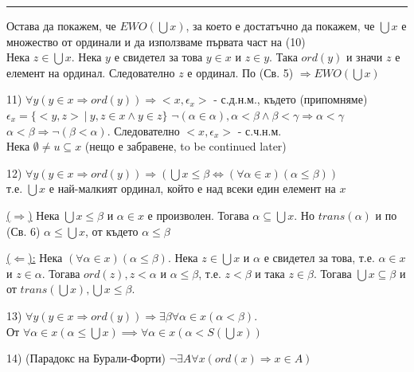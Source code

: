 \documentclass[fleqn, titlepage, 12pt]{report}
\begin{document}
\bigbreak
\hrule
\bigbreak

Остава да покажем, че $ EWO(\bigcup x) $, за което е достатъчно да покажем, че $ \bigcup x $ е множество от ординали
и да използваме първата част на (10)\\
Нека $ z \in \bigcup x $. Нека $ y $ е свидетел за това $ y \in x $ и $ z \in y $. Така $ ord(y) $ и значи $ z $ е елемент
на ординал. Следователно $ z $ е ординал. По (Св. 5) $ \Rightarrow EWO(\bigcup x) $
\bigbreak

11) $ \forall{y}(y \in x \Rightarrow ord(y)) \Rightarrow <x,\epsilon_x>$ - с.д.н.м.,
където (припомняме) $ \epsilon_x = \{<y,z>\ |\ y,z \in x \land y \in z\} $
\bigbreak
$ \lnot ( \alpha \in \alpha), \alpha < \beta \land \beta < \gamma \Rightarrow \alpha < \gamma $\\
$ \alpha < \beta \Rightarrow \lnot ( \beta < \alpha) $. Следователно $ <x, \epsilon_x> $ - с.ч.н.м.\\
Нека $ \emptyset \neq u \subseteq x $ (нещо е забравене, to be continued later)
\bigbreak

12) $ \forall{y}(y \in x \Rightarrow ord(y)) \Rightarrow (\bigcup x \leq \beta
\Leftrightarrow (\forall{ \alpha \in x})( \alpha \leq \beta))$\\
т.е. $ \bigcup x $ е най-малкият ординал, който е над всеки един елемент на $ x $
\bigbreak

\underline{($ \Rightarrow $)} Нека $ \bigcup x \leq \beta $ и $ \alpha \in x  $ е произволен.
Тогава $ \alpha \subseteq \bigcup x $. Но $ trans( \alpha) $ и по (Св. 6) $ \alpha \leq \bigcup x $,
от където $ \alpha \leq \beta$
\bigbreak

\underline{($ \Leftarrow $):} Нека $ (\forall{ \alpha \in x})( \alpha \leq \beta) $. Нека $ z \in \bigcup x $ и $ \alpha $
е свидетел за това, т.е. $ \alpha \in x $ и $ z \in \alpha $. Тогава $ ord(z), z < \alpha $ и $ \alpha \leq \beta $,
т.е. $ z < \beta $ и така $ z \in \beta $. Тогава $ \bigcup x \subseteq \beta $
и от $ trans(\bigcup x), \bigcup x \leq \beta $.
\bigbreak

13) $ \forall{y}(y \in x \Rightarrow ord(y)) \Rightarrow \exists{ \beta } \forall{ \alpha \in x}( \alpha < \beta)$.\\
От $ \forall{ \alpha \in x}( \alpha \leq \bigcup x) \implies \forall{ \alpha \in x}( \alpha < S(\bigcup x))$
\bigbreak

14) (Парадокс на Бурали-Форти) $ \lnot \exists{A} \forall{x}(ord(x) \Rightarrow x \in A) $
\bigbreak
\end{document}
